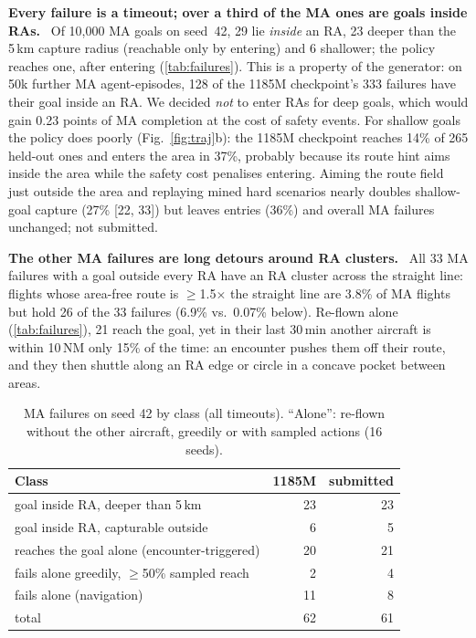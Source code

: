 \documentclass[10pt,twocolumn]{article}
\renewcommand{\paragraph}[1]{\par\smallskip\noindent\textbf{#1}\ }
\begin{document}
\paragraph{Every failure is a timeout; over a third of the MA ones are goals
inside RAs.} Of 10{,}000 MA goals on
seed~42, 29 lie \emph{inside} an RA, 23 deeper than the 5\,km capture radius
(reachable only by entering) and 6 shallower; the policy reaches one, after
entering (\autoref{tab:failures}). This is a property of the generator: on
50k further MA agent-episodes, 128 of the 1185M checkpoint's 333 failures have
their goal inside an RA. We decided \emph{not} to enter
RAs for deep goals, which would gain 0.23 points of MA completion at the
cost of safety events. For shallow goals the policy does poorly
(Fig.~\ref{fig:traj}b): the 1185M checkpoint reaches 14\% of 265 held-out ones
and enters the area in 37\%, probably because its route hint aims inside the
area while the safety cost penalises entering. Aiming the route field just outside the area and
replaying mined hard scenarios nearly doubles shallow-goal capture (27\% [22,
33]) but leaves entries (36\%) and overall MA failures unchanged; not submitted.

\paragraph{The other MA failures are long detours around RA clusters.} All 33 MA
failures with a goal outside every RA have an RA cluster across the straight
line: flights whose area-free route is $\geq$1.5$\times$ the straight line are
3.8\% of MA flights but hold 26 of the 33 failures (6.9\% vs.\ 0.07\% below). Re-flown alone (\autoref{tab:failures}), 21 reach
the goal, yet in their last 30\,min another aircraft is within 10\,NM only 15\%
of the time: an encounter pushes them off their route, and they then shuttle
along an RA edge or circle in a concave pocket between areas.

\begin{table}[t]
\centering\small
\caption{MA failures on seed 42 by class (all timeouts). ``Alone'': re-flown
without the other aircraft, greedily or with sampled actions (16 seeds).}
\label{tab:failures}
\setlength{\tabcolsep}{3pt}
\begin{tabular}{@{}lrr@{}}
\toprule
Class & 1185M & submitted\\
\midrule
goal inside RA, deeper than 5\,km & 23 & 23\\
goal inside RA, capturable outside & 6 & 5\\
reaches the goal alone (encounter-triggered) & 20 & 21\\
fails alone greedily, $\geq$50\% sampled reach & 2 & 4\\
fails alone (navigation) & 11 & 8\\
\midrule
total & 62 & 61\\
\bottomrule
\end{tabular}
\end{table}
\end{document}
